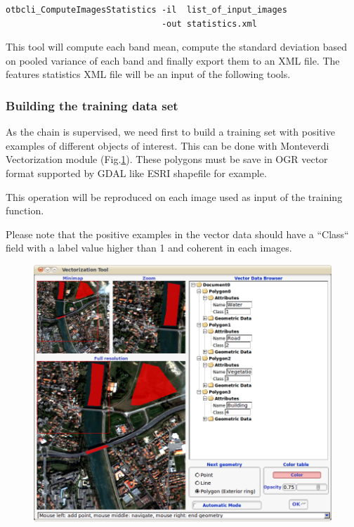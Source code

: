 \begin{verbatim}
otbcli_ComputeImagesStatistics -il  list_of_input_images 
                               -out statistics.xml
\end{verbatim}

This tool will compute each band mean, compute the standard deviation based on 
pooled variance of each band and finally export them to an XML file.
The features statistics XML file will be an input of the following tools. 

\subsubsection{Building the training data set}

As the chain is supervised, we need first to build a training set with
positive examples of different objects of interest. This can be done
with Monteverdi Vectorization module
(Fig.\ref{fig:vectoModuleDataSetCreation}). 
These polygons must be save in OGR vector format supported
by GDAL like ESRI shapefile for example.

This operation will be reproduced on each image used as input of the training 
function.

Please note that the positive examples in the vector data should have a ``Class`` 
field with a label value higher than 1 and coherent in each images. 

\begin{figure}
  \center
  \includegraphics[width=1\textwidth]{../Art/MonteverdiImages/monteverdi_vectorization_module_for_classification.png}
  \label{fig:vectoModuleDataSetCreation}
\end{figure}

